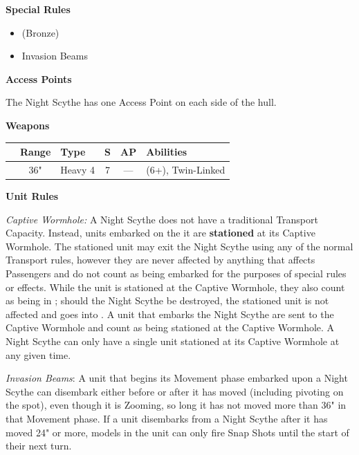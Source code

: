 \begin{minipage}[t]{0.72\textwidth}
\begin{minipage}[t]{0.5\textwidth}
\begin{flushleft}
			\textbf{Special Rules}
			\begin{itemize}
				\item {} (Bronze)
				\item Invasion Beams
			\end{itemize}
		\end{flushleft}
	\end{minipage}
	
	\vspace*{2em}
	\textbf{Access Points}
	
	The Night Scythe has one Access Point on each side of the hull.
	
	\vspace*{2em}
	\textbf{Weapons}
	
	\begin{tabular}{L{90 pt} c C{40pt} *{2}{c} >{\raggedright\arraybackslash}p{130pt}}
		& Range & Type & S & AP & Abilities \\
		\hline
		 & 36" & Heavy 4 & 7 & — &  (6+), Twin-Linked
	\end{tabular}
	
	\vspace*{2em}
	\textbf{Unit Rules}
	
	\textit{Captive Wormhole:} A Night Scythe does not have a traditional Transport Capacity. Instead, units embarked on the it are \textbf{stationed} at its Captive Wormhole. The stationed unit may exit the Night Scythe using any of the normal Transport rules, however they are never affected by anything that affects Passengers and do not count as being embarked for the purposes of special rules or effects. While the unit is stationed at the Captive Wormhole, they also count as being in ; should the Night Scythe be destroyed, the stationed unit is not affected and goes into . A unit that embarks the Night Scythe are sent to the Captive Wormhole and count as being stationed at the Captive Wormhole. A Night Scythe can only have a single unit stationed at its Captive Wormhole at any given time.
	
	\textit{Invasion Beams}: A unit that begins its Movement phase embarked upon a Night Scythe can disembark either before or after it has moved (including pivoting on the spot), even though it is Zooming, so long it has not moved more than 36" in that Movement phase. If a unit disembarks from a Night Scythe after it has moved 24" or more, models in the unit can only fire Snap Shots until the start of their next turn.
\end{minipage}


